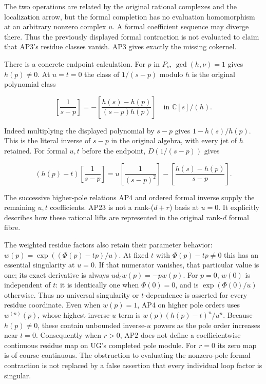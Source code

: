The two operations are related by the original rational complexes and the localization arrow, but the formal completion has no evaluation homomorphism at an arbitrary nonzero complex \(u\). A formal coefficient sequence may diverge there. Thus the previously displayed formal contraction is not evaluated to claim that AP3's residue classes vanish. AP3 gives exactly the missing cokernel.

There is a concrete endpoint calculation. For \(p\) in \(P_\nu\), \(\gcd(h,\nu)=1\) gives \(h(p)\ne0\). At \(u=t=0\) the class of \(1/(s-p)\) modulo \(h\) is the original polynomial class

\[
\left[\frac{1}{s-p}\right]
=-\left[\frac{h(s)-h(p)}{(s-p)h(p)}\right]
\quad\text{in }\mathbb C[s]/(h).
\tag{AP23}
\]

Indeed multiplying the displayed polynomial by \(s-p\) gives \(1-h(s)/h(p)\). This is the literal inverse of \(s-p\) in the original algebra, with every jet of \(h\) retained. For formal \(u,t\) before the endpoint, \(D(1/(s-p))\) gives

\[
(h(p)-t)\left[\frac{1}{s-p}\right]
=u\left[\frac{1}{(s-p)^2}\right]
-\left[\frac{h(s)-h(p)}{s-p}\right].
\tag{AP24}
\]

The successive higher-pole relations AP4 and ordered formal inverse supply the remaining \(u,t\) coefficients. AP23 is not a rank-(\(d+r\)) basis at \(u=0\). It explicitly describes how these rational lifts are represented in the original rank-\(d\) formal fibre.

The weighted residue factors also retain their parameter behavior: \(w(p)=\exp((\Phi(p)-tp)/u)\). At fixed \(t\) with \(\Phi(p)-tp\ne0\) this has an essential singularity at \(u=0\). If that numerator vanishes, that particular value is one; its exact derivative is always \(u d_t w(p)=-p w(p)\). For \(p=0\), \(w(0)\) is independent of \(t\): it is identically one when \(\Phi(0)=0\), and is \(\exp(\Phi(0)/u)\) otherwise. Thus no universal singularity or \(t\)-dependence is asserted for every residue coordinate. Even when \(w(p)=1\), AP4 on higher pole orders uses \(w^{(n)}(p)\), whose highest inverse-\(u\) term is \(w(p)(h(p)-t)^n/u^n\). Because \(h(p)\ne0\), these contain unbounded inverse-\(u\) powers as the pole order increases near \(t=0\). Consequently when \(r>0\), AP2 does not define a coefficientwise continuous residue map on UG's completed pole module. For \(r=0\) its zero map is of course continuous. The obstruction to evaluating the nonzero-pole formal contraction is not replaced by a false assertion that every individual loop factor is singular.

